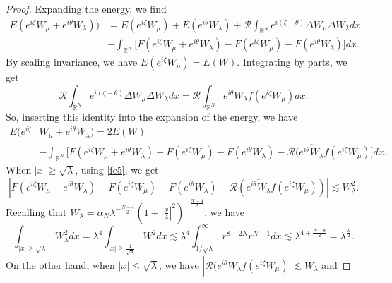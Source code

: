 \documentclass[a4paper,two-side,10pt]{amsart}
\newcommand{\R}{\mathbb{R}}
\numberwithin{equation}{section}
\begin{document}
\begin{proof}
Expanding the energy, we find
\begin{align*}
E(e^{i\zeta} W_\mu +e^{i\theta} W_\lambda)) &= E(e^{i\zeta} W_\mu ) +E(e^{i\theta} W_\lambda) +\mathcal{R} \int_{\R^N} e^{i(\zeta - \theta)} \Delta W_\mu \Delta W_\lambda dx \\
& - \int_{\R^N} \big[F(e^{i\zeta} W_\mu + e^{i\theta} W_\lambda) -F(e^{i\zeta} W_\mu) - F(e^{i\theta} W_\lambda) \big] dx.
\end{align*}
By scaling invariance, we have $E(e^{i\zeta} W_\mu) =E(W)$. Integrating by parts, we get
$$\mathcal{R} \int_{\R^N} e^{i(\zeta -\theta ) } \Delta W_\mu \Delta W_\lambda dx =  \mathcal{R} \int_{\R^N} \overline{e^{i\theta} W_\lambda} f(e^{i\zeta} W_\mu) dx.$$
So, inserting this identity into the expansion of the energy, we have
\begin{align*}
E(e^{i\zeta} & W_\mu +e^{i\theta} W_\lambda)= 2E(W) \\
&-\int_{\R^N} \big[F (e^{i\zeta} W_\mu +e^{i\theta} W_\lambda) -F (e^{i\zeta} W_\mu) - F (e^{i\theta} W_\lambda) - \mathcal{R} ( \overline{e^{i\theta} W_\lambda } f(e^{i\zeta} W_\mu)\big] dx. 
\end{align*}
When $|x|\geq \sqrt{\lambda}$, using 
\eqref{fe5}, we get 
$$|F (e^{i\zeta} W_\mu +e^{i\theta} W_\lambda) -F (e^{i\zeta} W_\mu) - F (e^{i\theta} W_\lambda) - \mathcal{R} ( \overline{e^{i\theta} W_\lambda } f(e^{i\zeta} W_\mu))|\lesssim W_\lambda^2 .$$
Recalling that $W_\lambda= \alpha_N \lambda^{-\frac{N-4}{2}} (1+|\frac{x}{\lambda}|^2)^{- \frac{N-4}{2}}$, we have
$$\int_{|x|\geq \sqrt{\lambda}} W_\lambda^2 dx = \lambda^4 \int_{|x|\geq \frac{1}{\sqrt{\lambda}} } W^2 dx\lesssim \lambda^4 \int_{1/\sqrt{\lambda}}^\infty r^{8-2N}r^{N-1} dx \lesssim \lambda^{4+ \frac{N-8}{2}}= \lambda^{\frac{N}{2}}.   $$
On the other hand, when $|x|\leq \sqrt{\lambda}$, we have $|\mathcal{R} ( \overline{e^{i\theta} W_\lambda } f(e^{i\zeta} W_\mu)| \lesssim W_\lambda $ and


\end{proof}
\end{document}
